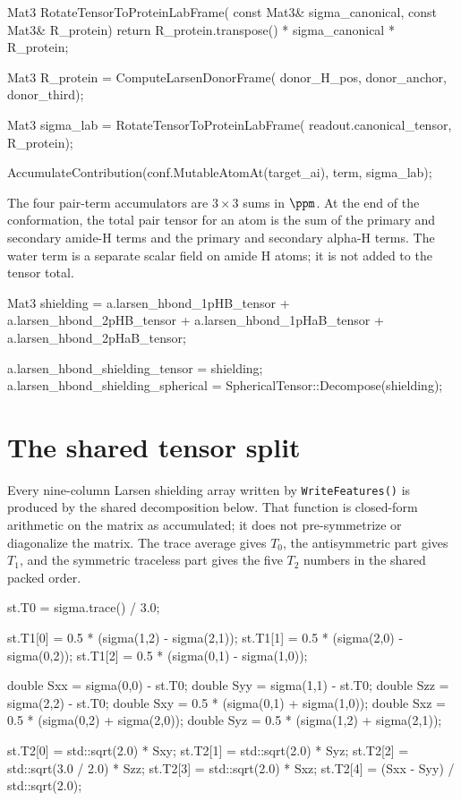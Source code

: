 \documentclass[11pt]{article}
\newcommand{\code}[1]{\texttt{#1}}
\begin{document}
\begin{codebox}
Mat3 RotateTensorToProteinLabFrame(
    const Mat3& sigma_canonical,
    const Mat3& R_protein) {
    return R_protein.transpose() * sigma_canonical * R_protein;
}

Mat3 R_protein = ComputeLarsenDonorFrame(
    donor_H_pos, donor_anchor, donor_third);

Mat3 sigma_lab = RotateTensorToProteinLabFrame(
    readout.canonical_tensor, R_protein);

AccumulateContribution(conf.MutableAtomAt(target_ai),
                       term, sigma_lab);
\end{codebox}

The four pair-term accumulators are \(3\times3\) sums in
\(\si{\ppm}\). At the end of the conformation, the total pair tensor for an
atom is the sum of the primary and secondary amide-H terms and the primary and
secondary alpha-H terms. The water term is a separate scalar field on amide H
atoms; it is not added to the tensor total.

\begin{codebox}
Mat3 shielding = a.larsen_hbond_1pHB_tensor
               + a.larsen_hbond_2pHB_tensor
               + a.larsen_hbond_1pHaB_tensor
               + a.larsen_hbond_2pHaB_tensor;

a.larsen_hbond_shielding_tensor    = shielding;
a.larsen_hbond_shielding_spherical =
    SphericalTensor::Decompose(shielding);
\end{codebox}

\section{The shared tensor split}

Every nine-column Larsen shielding array written by \code{WriteFeatures()} is
produced by the shared decomposition below. That function is closed-form
arithmetic on the matrix as accumulated; it does not pre-symmetrize or
diagonalize the matrix. The trace average gives \(T_0\), the antisymmetric
part gives \(T_1\), and the symmetric traceless part gives the five \(T_2\)
numbers in the shared packed order.

\begin{codebox}
st.T0 = sigma.trace() / 3.0;

st.T1[0] = 0.5 * (sigma(1,2) - sigma(2,1));
st.T1[1] = 0.5 * (sigma(2,0) - sigma(0,2));
st.T1[2] = 0.5 * (sigma(0,1) - sigma(1,0));

double Sxx = sigma(0,0) - st.T0;
double Syy = sigma(1,1) - st.T0;
double Szz = sigma(2,2) - st.T0;
double Sxy = 0.5 * (sigma(0,1) + sigma(1,0));
double Sxz = 0.5 * (sigma(0,2) + sigma(2,0));
double Syz = 0.5 * (sigma(1,2) + sigma(2,1));

st.T2[0] = std::sqrt(2.0) * Sxy;
st.T2[1] = std::sqrt(2.0) * Syz;
st.T2[2] = std::sqrt(3.0 / 2.0) * Szz;
st.T2[3] = std::sqrt(2.0) * Sxz;
st.T2[4] = (Sxx - Syy) / std::sqrt(2.0);
\end{codebox}
\end{document}
